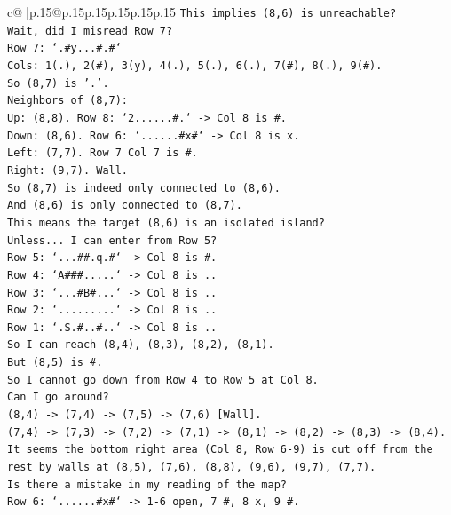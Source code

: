 \documentclass{article}
\begin{document}
{\begin{supertabular}{c@{$\;$}|p{.15\linewidth}@{}p{.15\linewidth}p{.15\linewidth}p{.15\linewidth}p{.15\linewidth}p{.15\linewidth}}
{{{\texttt{This implies (8,6) is unreachable?} \\
\texttt{Wait, did I misread Row 7?} \\
\texttt{Row 7: `.\#y...\#.\#`} \\
\texttt{Cols: 1(.), 2(\#), 3(y), 4(.), 5(.), 6(.), 7(\#), 8(.), 9(\#).} \\
\texttt{So (8,7) is '.'.} \\
\texttt{Neighbors of (8,7):} \\
\texttt{Up: (8,8). Row 8: `2......\#.` {-}> Col 8 is \#.} \\
\texttt{Down: (8,6). Row 6: `......\#x\#` {-}> Col 8 is x.} \\
\texttt{Left: (7,7). Row 7 Col 7 is \#.} \\
\texttt{Right: (9,7). Wall.} \\
\texttt{So (8,7) is indeed only connected to (8,6).} \\
\texttt{And (8,6) is only connected to (8,7).} \\
\texttt{This means the target (8,6) is an isolated island?} \\
\texttt{Unless... I can enter from Row 5?} \\
\texttt{Row 5: `...\#\#.q.\#` {-}> Col 8 is \#.} \\
\texttt{Row 4: `A\#\#\#.....` {-}> Col 8 is ..} \\
\texttt{Row 3: `...\#B\#...` {-}> Col 8 is ..} \\
\texttt{Row 2: `.........` {-}> Col 8 is ..} \\
\texttt{Row 1: `.S.\#..\#..` {-}> Col 8 is ..} \\
\texttt{So I can reach (8,4), (8,3), (8,2), (8,1).} \\
\texttt{But (8,5) is \#.} \\
\texttt{So I cannot go down from Row 4 to Row 5 at Col 8.} \\
\texttt{Can I go around?} \\
\texttt{(8,4) {-}> (7,4) {-}> (7,5) {-}> (7,6) {[}Wall{]}.} \\
\texttt{(7,4) {-}> (7,3) {-}> (7,2) {-}> (7,1) {-}> (8,1) {-}> (8,2) {-}> (8,3) {-}> (8,4).} \\
\texttt{It seems the bottom right area (Col 8, Row 6{-}9) is cut off from the rest by walls at (8,5), (7,6), (8,8), (9,6), (9,7), (7,7).} \\
\texttt{Is there a mistake in my reading of the map?} \\
\texttt{Row 6: `......\#x\#` {-}> 1{-}6 open, 7 \#, 8 x, 9 \#.} \\
}}}
\end{supertabular}}
\end{document}
